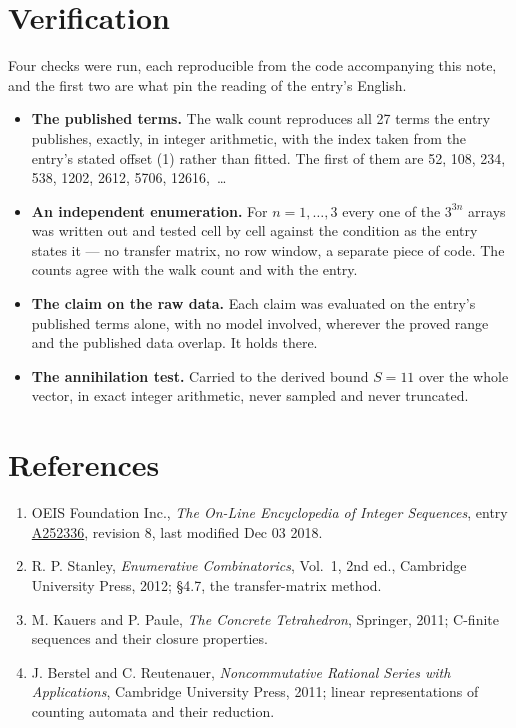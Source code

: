 \documentclass[11pt]{article}
\theoremstyle{definition}
\begin{document}
\section{Verification}

Four checks were run, each reproducible from the code accompanying this note, and the first two are what pin the reading of the entry's English.

\begin{itemize}

\item {\bfseries The published terms.} The walk count reproduces all 27 terms the entry publishes, exactly, in integer arithmetic, with the index taken from the entry's stated offset (1) rather than fitted. The first of them are 52, 108, 234, 538, 1202, 2612, 5706, 12616,~\dots

\item {\bfseries An independent enumeration.} For $n = 1,\dots,3$ every one of the $3^{3n}$ arrays was written out and tested cell by cell against the condition as the entry states it --- no transfer matrix, no row window, a separate piece of code. The counts agree with the walk count and with the entry.

\item {\bfseries The claim on the raw data.} Each claim was evaluated on the entry's published terms alone, with no model involved, wherever the proved range and the published data overlap. It holds there.

\item {\bfseries The annihilation test.} Carried to the derived bound $S = 11$ over the whole vector, in exact integer arithmetic, never sampled and never truncated.

\end{itemize}

\section{References}

\begin{enumerate}

\item OEIS Foundation Inc., \emph{The On-Line Encyclopedia of Integer Sequences}, entry \href{https://oeis.org/A252336}{A252336}, revision 8, last modified Dec 03 2018.

\item R. P. Stanley, \emph{Enumerative Combinatorics}, Vol.~1, 2nd ed., Cambridge University Press, 2012; \S4.7, the transfer-matrix method.

\item M. Kauers and P. Paule, \emph{The Concrete Tetrahedron}, Springer, 2011; C-finite sequences and their closure properties.

\item J. Berstel and C. Reutenauer, \emph{Noncommutative Rational Series with Applications}, Cambridge University Press, 2011; linear representations of counting automata and their reduction.

\end{enumerate}
\end{document}
